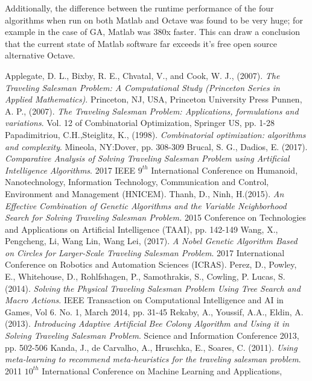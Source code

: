 \documentclass[twocolumn]{article}
\begin{document}
	Additionally, the difference between the runtime performance of the four algorithms when run on both {Matlab\texttrademark} and Octave was found to be very huge; for example in the case of GA, {Matlab\texttrademark} was 380x faster. This can draw a conclusion that the current state of {Matlab\texttrademark} software far exceeds it's free open source alternative Octave.
	\begin{thebibliography}{999}
		Applegate, D. L., Bixby, R. E., Chvatal, V.,  and Cook, W. J., (2007).
		\emph{The Traveling Salesman Problem: A Computational Study (Princeton Series in Applied Mathematics)}.
		Princeton, NJ, USA,
		Princeton University Press
		Punnen, A. P., (2007).
		\emph{The Traveling Salesman Problem: Applications, formulations and variations}.
		Vol. 12 of Combinatorial Optimization,
		Springer US,
		pp. 1-28
		Papadimitriou, C.H.,Steiglitz, K., (1998).
		\emph{Combinatorial optimization: algorithms and complexity}. Mineola, NY:Dover,
		pp. 308-309
		Brucal, S. G., Dadios, E. (2017).
		\emph{Comparative Analysis of Solving Traveling Salesman Problem using Artificial Intelligence Algorithms}.
		2017 IEEE $9^{th}$ International Conference on Humanoid, Nanotechnology, Information Technology, Communication and Control, Environment and Management (HNICEM).
		Thanh, D., Ninh, H.(2015).
		\emph{An Effective Combination of Genetic Algorithms and the Variable Neighborhood Search for Solving Traveling Salesman Problem.}
		2015 Conference on Technologies and Applications on Artificial Intelligence (TAAI),
		pp. 142-149
		Wang, X., Pengcheng, Li, Wang Lin, Wang Lei, (2017).
		\emph{A Nobel Genetic Algorithm Based on Circles for Larger-Scale Traveling Salesman Problem}. 2017 International Conference on Robotics and Automation Sciences (ICRAS).
		Perez, D., Powley, E., Whitehouse, D., Rohlfshagen, P., Samothrakis, S., Cowling, P. Lucas, S. (2014).
		\emph{Solving the Physical Traveling Salesman Problem Using Tree Search and Macro Actions}. IEEE Transaction on Computational Intelligence and AI in Games, Vol 6. No. 1, March 2014,
		pp. 31-45
		Rekaby, A., Youssif, A.A., Eldin, A. (2013).
		\emph{Introducing Adaptive Artificial Bee Colony Algorithm and Using it in Solving Traveling Salesman Problem}.
		Science and Information Conference 2013,
		pp. 502-506
		Kanda, J., de Carvalho, A., Hruschka, E., Soares, C. (2011).
		\emph{Using meta-learning to recommend meta-heuristics for the traveling salesman problem}. 2011 $10^{th}$ International Conference on Machine Learning and Applications,

\end{thebibliography}
\end{document}
